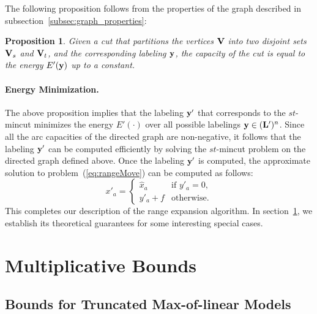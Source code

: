 \documentclass[10pt,letterpaper]{article}
\newtheorem{proposition}{Proposition}
\begin{document}
The following proposition follows from the properties of the graph described in subsection~\ref{subsec:graph_properties}:

\begin{proposition}
\label{prop:graphCut}
Given a cut that partitions the vertices ${\bf V}$ into two disjoint sets ${\bf V}_s$ and ${\bf V}_t$, and the corresponding
labeling ${\bf y}$, the capacity of the cut is equal to the energy $E'({\bf y})$
up to a constant.
\end{proposition}

\paragraph{Energy Minimization.} The above proposition implies that 
the labeling ${\bf y}'$ that corresponds to the $st$-{\sc mincut} minimizes the energy $E'(\cdot)$ over all
possible labelings ${\bf y} \in ({\bf L}')^n$. Since all the arc capacities of the directed graph are non-negative, it follows that
the labeling ${\bf y}'$ can be computed efficiently by solving the $st$-{\sc mincut} problem on the directed graph defined above.
Once the labeling ${\bf y}'$ is computed, the approximate solution to problem~(\ref{eq:rangeMove}) can be computed as follows:
\begin{equation}
x'_a = 
\begin{cases}
\hat{x}_a & \text{if } y'_a = 0, \\
y'_a+f & \text{otherwise.}
\end{cases}
\end{equation}
This completes our description of the range expansion algorithm. In section~\ref{sec:Bounds}, we establish its theoretical guarantees for
some interesting special cases.


\section{Multiplicative Bounds}
\label{sec:Bounds}


\subsection{Bounds for Truncated Max-of-linear Models}
\end{document}
